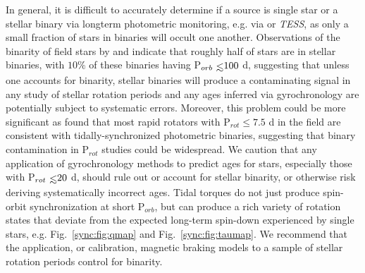 In general, it is difficult to accurately determine if a source is single star or a stellar binary via longterm photometric monitoring, e.g. via \kepler or \textit{TESS}, as only a small fraction of stars in binaries will occult one another. Observations of the binarity of field stars by \citet{Raghavan2010} and \citet{Duchene2013} indicate that roughly half of stars are in stellar binaries, with $10\%$ of these binaries having P$_{orb} \lsim 100$ d, suggesting that unless one accounts for binarity, stellar binaries will produce a contaminating signal in any study of stellar rotation periods and any ages inferred via gyrochronology are potentially subject to systematic errors.  Moreover, this problem could be more significant as \citet{Simonian2018} found that most rapid rotators with P$_{rot} \leq 7.5$ d in the \kepler field are consistent with tidally-synchronized photometric binaries, suggesting that binary contamination in P$_{rot}$ studies could be widespread. We caution that any application of gyrochronology methods to predict ages for stars, especially those with P$_{rot} \lsim 20$ d, should rule out or account for stellar binarity, or otherwise risk deriving systematically incorrect ages. Tidal torques do not just produce spin-orbit synchronization at short P$_{orb}$, but can produce a rich variety of rotation states that deviate from the expected long-term spin-down experienced by single stars, e.g. Fig.~\ref{sync:fig:qmap} and Fig.~\ref{sync:fig:taumap}. We recommend that the application, or calibration, magnetic braking models to a sample of stellar rotation periods control for binarity.   




